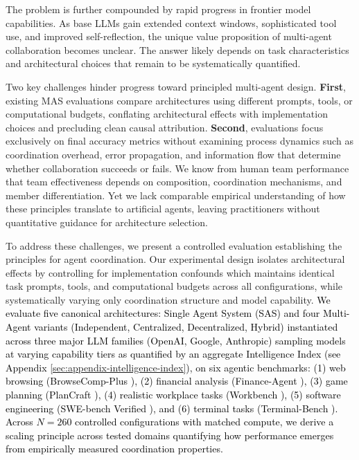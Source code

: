 The problem is further compounded by rapid progress in frontier model capabilities. As base LLMs gain extended context windows, sophisticated tool use, and improved self-reflection, the unique value proposition of multi-agent collaboration becomes unclear. The answer likely depends on task characteristics and architectural choices that remain to be systematically quantified.

Two key challenges hinder progress toward principled multi-agent design. \textbf{First}, existing MAS evaluations compare architectures using different prompts, tools, or computational budgets, conflating architectural effects with implementation choices and precluding clean causal attribution. \textbf{Second}, evaluations focus exclusively on final accuracy metrics without examining process dynamics such as coordination overhead, error propagation, and information flow that determine whether collaboration succeeds or fails. We know from human team performance~\citep{mcgrath1964,lencioni2002} that team effectiveness depends on composition, coordination mechanisms, and member differentiation. Yet we lack comparable empirical understanding of how these principles translate to artificial agents, leaving practitioners without quantitative guidance for architecture selection.

To address these challenges, we present a controlled evaluation establishing the principles for agent coordination. Our experimental design isolates architectural effects by controlling for implementation confounds which maintains identical task prompts, tools, and computational budgets across all configurations, while systematically varying only coordination structure and model capability. \textcolor{black}{We evaluate five canonical architectures: Single Agent System (SAS) and four Multi-Agent variants (Independent, Centralized, Decentralized, Hybrid) instantiated across three major LLM families (OpenAI, Google, Anthropic) sampling models at varying capability tiers as quantified by an aggregate Intelligence Index (see Appendix \ref{sec:appendix-intelligence-index}), on six agentic benchmarks: (1) web browsing (BrowseComp-Plus \citep{chen2025browsecomp}), (2) financial analysis (Finance-Agent \citep{bigeard2025finance}), (3) game planning (PlanCraft \citep{dagan2024plancraft}), (4) realistic workplace tasks (Workbench \citep{styles2024workbench}), (5) software engineering (SWE-bench Verified \citep{jimenez2023swe}), and (6) terminal tasks (Terminal-Bench \citep{merrill2026terminal}). Across $N{=}260$ controlled configurations with matched compute, we derive a scaling principle across tested domains quantifying how performance emerges from empirically measured coordination properties.}

